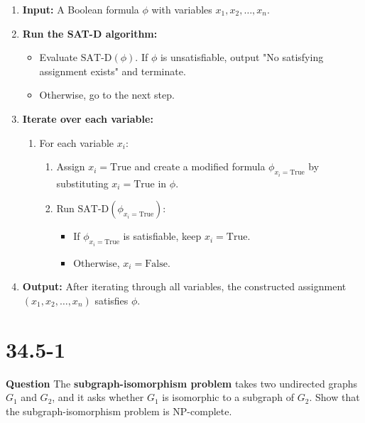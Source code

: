 \documentclass[12pt]{article}
\begin{document}
\begin{enumerate}
    \item \textbf{Input:} A Boolean formula \( \phi \) with variables \( x_1, x_2, \ldots, x_n \).
    \item \textbf{Run the SAT-D algorithm:}
    \begin{itemize}
        \item Evaluate \( \text{SAT-D}(\phi) \). If \( \phi \) is unsatisfiable, output "No satisfying assignment exists" and terminate.
        \item Otherwise, go to the next step.
    \end{itemize}
    \item \textbf{Iterate over each variable:}
    \begin{enumerate}
        \item For each variable \( x_i \):
        \begin{enumerate}
            \item Assign \( x_i = \text{True} \) and create a modified formula \( \phi_{x_i=\text{True}} \) by substituting \( x_i = \text{True} \) in \( \phi \).
            \item Run \( \text{SAT-D}(\phi_{x_i=\text{True}}) \):
            \begin{itemize}
                \item If \( \phi_{x_i=\text{True}} \) is satisfiable, keep \( x_i = \text{True} \).
                \item Otherwise, \( x_i = \text{False} \).
            \end{itemize}
        \end{enumerate}
    \end{enumerate}
    \item \textbf{Output:} After iterating through all variables, the constructed assignment \( (x_1, x_2, \ldots, x_n) \) satisfies \( \phi \).
\end{enumerate}

\section{34.5-1}
\textbf{Question}
The \textbf{subgraph-isomorphism problem} takes two undirected graphs $G_1$ and $G_2$, and it asks whether $G_1$ is isomorphic to a subgraph of $G_2$. Show that the subgraph-isomorphism problem is NP-complete.\\
\end{document}
